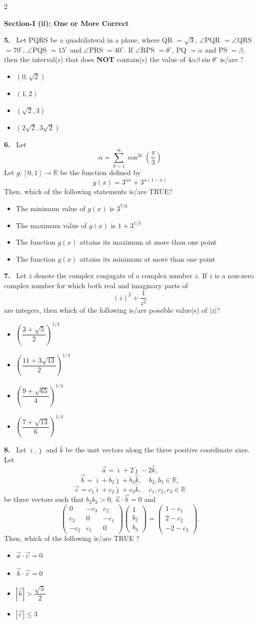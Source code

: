 \documentclass[10pt]{extarticle}
\newcommand{\sect}[1]{\par\smallskip\noindent\textbf{#1}\par}
\newcommand{\qn}[1]{\par\smallskip\noindent\textbf{#1.}~}
\newenvironment{qoptions}{\begin{itemize}[leftmargin=1.8em,itemsep=1pt,topsep=2pt,label={}]}{\end{itemize}}
\newcommand{\opt}[2]{\item[(#1)] #2}
\begin{document}
\begin{multicols}{2}
\sect{Section-I (ii): One or More Correct}

\qn{5} Let PQRS be a quadrilateral in a plane, where QR $=\sqrt3$, $\angle$PQR $=\angle$QRS $=70^\circ$, $\angle$PQS $=15^\circ$ and $\angle$PRS $=40^\circ$. If $\angle$RPS $=\theta^\circ$, PQ $=\alpha$ and PS $=\beta$, then the interval(s) that does \textbf{NOT} contain(s) the value of $4\alpha\beta\sin\theta^\circ$ is/are ?
\begin{qoptions}
\opt{A}{$(0,\sqrt2)$}
\opt{B}{$(1,2)$}
\opt{C}{$(\sqrt2,3)$}
\opt{D}{$(2\sqrt2,3\sqrt2)$}
\end{qoptions}

\qn{6} Let
\[\alpha = \sum_{k=1}^{\infty}\cos^{2k}\left(\dfrac{\pi}{3}\right)\]
Let $g:[0,1]\to\mathbb R$ be the function defined by
\[g(x) = 3^{\alpha x}+3^{\alpha(1-x)}\]
Then, which of the following statements is/are TRUE?
\begin{qoptions}
\opt{A}{The minimum value of $g(x)$ is $3^{7/6}$}
\opt{B}{The maximum value of $g(x)$ is $1+3^{1/3}$}
\opt{C}{The function $g(x)$ attains its maximum at more than one point}
\opt{D}{The function $g(x)$ attains its minimum at more than one point}
\end{qoptions}

\qn{7} Let $\bar z$ denote the complex conjugate of a complex number $z$. If $z$ is a non-zero complex number for which both real and imaginary parts of
\[(\bar z)^2+\dfrac{1}{z^2}\]
are integers, then which of the following is/are possible value(s) of $|z|$?
\begin{qoptions}
\opt{A}{$\left(\dfrac{3+\sqrt5}{2}\right)^{1/4}$}
\opt{B}{$\left(\dfrac{11+3\sqrt{13}}{2}\right)^{1/4}$}
\opt{C}{$\left(\dfrac{9+\sqrt{65}}{4}\right)^{1/4}$}
\opt{D}{$\left(\dfrac{7+\sqrt{13}}{6}\right)^{1/4}$}
\end{qoptions}

\qn{8} Let $\hat\imath,\hat\jmath$ and $\hat k$ be the unit vectors along the three positive coordinate axes. Let
\[\vec a = \hat\imath+2\hat\jmath-2\hat k,\]
\[\vec b = \hat\imath+b_2\hat\jmath+b_3\hat k,\quad b_2,b_3\in\mathbb R,\]
\[\vec c = c_1\hat\imath+c_2\hat\jmath+c_3\hat k,\quad c_1,c_2,c_3\in\mathbb R\]
be three vectors such that $b_2b_3>0$, $\vec a\cdot\vec b=0$ and
\[\begin{pmatrix}0 & -c_3 & c_2\\ c_3 & 0 & -c_1\\ -c_2 & c_1 & 0\end{pmatrix}\begin{pmatrix}1\\ b_2\\ b_3\end{pmatrix} = \begin{pmatrix}1-c_1\\ 2-c_2\\ -2-c_3\end{pmatrix}.\]
Then, which of the following is/are TRUE ?
\begin{qoptions}
\opt{A}{$\vec a\cdot\vec c = 0$}
\opt{B}{$\vec b\cdot\vec c = 0$}
\opt{C}{$|\vec b|>\dfrac{\sqrt5}{2}$}
\opt{D}{$|\vec c|\le3$}
\end{qoptions}


\end{multicols}
\end{document}
